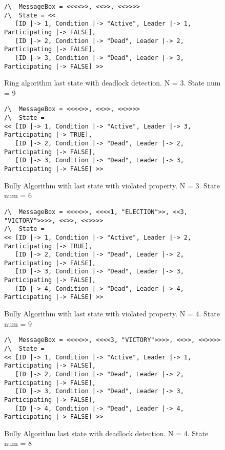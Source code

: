 \documentclass{report}
\begin{document}
\begin{figure}
\begin{lstlisting}
/\  MessageBox = <<<<>>, <<>>, <<>>>>
/\  State = <<
   [ID |-> 1, Condition |-> "Active", Leader |-> 1, Participating |-> FALSE],
   [ID |-> 2, Condition |-> "Dead", Leader |-> 2, Participating |-> FALSE],
   [ID |-> 3, Condition |-> "Dead", Leader |-> 3, Participating |-> FALSE] >>
\end{lstlisting}

  \caption{Ring algorithm last state with deadlock detection. N = 3. State num = 9}
  \label{ringdeadlocksuccess}
\end{figure}

\begin{figure}
\begin{lstlisting}
/\  MessageBox = <<<<>>, <<>>, <<>>>>
/\  State =
<< [ID |-> 1, Condition |-> "Active", Leader |-> 3, Participating |-> TRUE],
   [ID |-> 2, Condition |-> "Dead", Leader |-> 2, Participating |-> FALSE],
   [ID |-> 3, Condition |-> "Dead", Leader |-> 3, Participating |-> FALSE] >>
\end{lstlisting}


  \caption{Bully Algorithm with last state with violated property. N = 3. State num = 6}
  \label{bullyfailuren3}
\end{figure}

\begin{figure}
\begin{lstlisting}
/\  MessageBox = <<<<>>, <<<<1, "ELECTION">>, <<3, "VICTORY">>>>, <<>>, <<>>>>
/\  State =
<< [ID |-> 1, Condition |-> "Active", Leader |-> 2, Participating |-> TRUE],
   [ID |-> 2, Condition |-> "Dead", Leader |-> 2, Participating |-> FALSE],
   [ID |-> 3, Condition |-> "Dead", Leader |-> 3, Participating |-> FALSE],
   [ID |-> 4, Condition |-> "Dead", Leader |-> 4, Participating |-> FALSE] >>
\end{lstlisting}


  \caption{Bully Algorithm with last state with violated property. N = 4. State num = 9}
  \label{bullyfailuren4}
\end{figure}


\begin{figure}
\begin{lstlisting}
/\  MessageBox = <<<<>>, <<<<3, "VICTORY">>>>, <<>>, <<>>>>
/\  State =
<< [ID |-> 1, Condition |-> "Active", Leader |-> 1, Participating |-> FALSE],
   [ID |-> 2, Condition |-> "Dead", Leader |-> 2, Participating |-> FALSE],
   [ID |-> 3, Condition |-> "Dead", Leader |-> 3, Participating |-> FALSE],
   [ID |-> 4, Condition |-> "Dead", Leader |-> 4, Participating |-> FALSE] >>
\end{lstlisting}

  \caption{Bully Algorithm last state with deadlock detection. N = 4. State num = 8}
  \label{bullydeadlocksuccess}
\end{figure}
\end{document}
